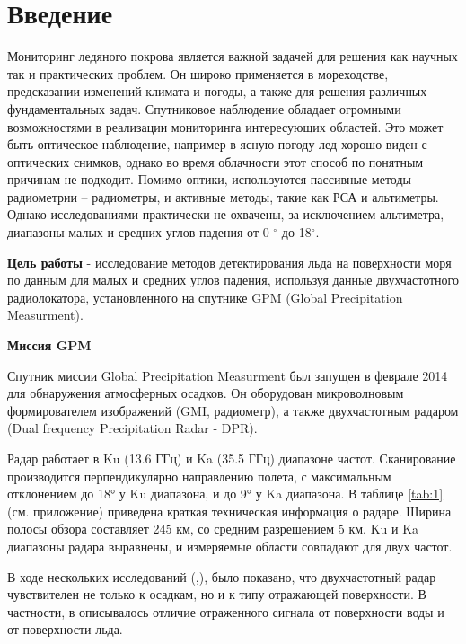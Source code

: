 





\tableofcontents
\newpage
\section{Введение}

Мониторинг ледяного покрова является важной задачей для решения как научных так и практических проблем. Он широко
применяется в мореходстве, предсказании изменений климата и погоды, а также для решения различных фундаментальных задач.
Спутниковое наблюдение обладает огромными возможностями в реализации мониторинга интересующих областей.
Это может быть оптическое наблюдение, например в ясную погоду лед хорошо виден с оптических снимков, однако во время
облачности этот способ по понятным причинам не подходит. Помимо оптики, используются пассивные методы радиометрии –
радиометры, и активные методы, такие как РСА и альтиметры. Однако исследованиями практически не охвачены, за исключением
альтиметра, диапазоны малых и средних углов падения от 0 $^{\circ}$ до 18$^{\circ}$.

\textbf{Цель работы} - исследование методов детектирования льда на поверхности моря по данным для малых и средних углов падения,
используя данные двухчастотного радиолокатора, установленного на спутнике GPM (Global Precipitation Measurment).

\vspace{15pt}
\textbf{Миссия GPM}

Спутник миссии Global Precipitation Measurment был запущен в феврале 2014 для обнаружения атмосферных осадков.
Он оборудован микроволновым формирователем изображений (GMI, радиометр), а также двухчастотным радаром (Dual frequency
Precipitation Radar - DPR). 

Радар работает в Ku (13.6 ГГц) и Ka (35.5 ГГц) диапазоне частот. Сканирование производится перпендикулярно направлению
полета, с максимальным отклонением до 18° у Ku диапазона, и до 9° у Ka диапазона. В таблице \ref{tab:1} (см. приложение) приведена краткая
техническая информация о радаре. Ширина полосы обзора составляет 245 км, со средним разрешением 5 км. Ku и Ka диапазоны
радара выравнены, и измеряемые области совпадают для двух частот.  

В ходе нескольких исследований (\cite{kar1},\cite{masha}), было показано, что двухчастотный радар
чувствителен не только к осадкам, но и к типу отражающей поверхности. В частности, в \cite{kar1} описывалось отличие
отраженного сигнала от поверхности воды и от поверхности льда.



